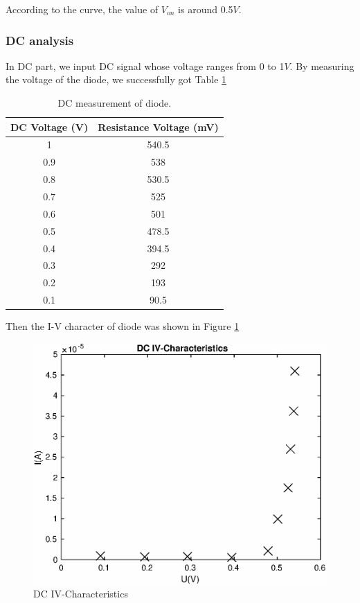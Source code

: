 \documentclass{article}
\begin{document}
\newpage

According to the curve, the value of $V_{on}$ is around 0.5$V$.

\subsubsection{DC analysis}
In DC part, we input DC signal whose voltage ranges from 0 to 1$V$. By measuring the voltage of the diode, we successfully got  Table \ref{tab-2} 

\begin{table}[!htbp]
    \centering
    \begin{tabular}{|c|c|}
    \hline
    DC Voltage (V) & Resistance Voltage (mV) \\\hline
    1	&   540.5   \\\hline
    0.9	&   538     \\\hline
    0.8	&   530.5   \\\hline
    0.7	&   525     \\\hline
    0.6	&   501     \\\hline
    0.5	&   478.5   \\\hline
    0.4	&   394.5   \\\hline
    0.3	&   292     \\\hline
    0.2	&   193     \\\hline
    0.1	&   90.5    \\\hline
    \end{tabular}
    \caption{DC measurement of diode.}
    \label{tab-2}
\end{table}

Then the I-V character of diode was shown in Figure \ref{fig-2-3}

\begin{figure}[!htbp]
	\centering
	\includegraphics[width=0.7\linewidth]{imgs/dc-iv.eps}
	\caption{DC IV-Characteristics}
	\label{fig-2-3}
\end{figure}
\end{document}
